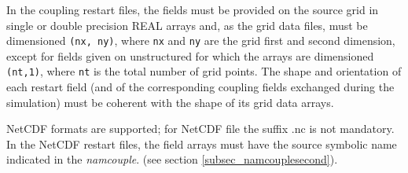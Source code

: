 In the coupling restart files, the fields must be provided on the source grid in single or double
precision REAL arrays and, as the grid data files, must be dimensioned {\tt (nx,
ny)}, where {\tt nx} and {\tt ny} are the grid first and second
dimension, except for fields given on unstructured 
for which the arrays are dimensioned {\tt (nt,1)},
where {\tt nt} is the total number of grid points.  The shape
and orientation of each restart field (and of the corresponding
coupling fields exchanged during the simulation) must be coherent with
the shape of its grid data arrays. 

NetCDF formats are supported; for NetCDF file the
suffix .nc is not mandatory.  In the NetCDF restart files, the field 
arrays must have the source symbolic
name indicated in the {\it namcouple}.
(see section \ref{subsec_namcouplesecond}).

%


